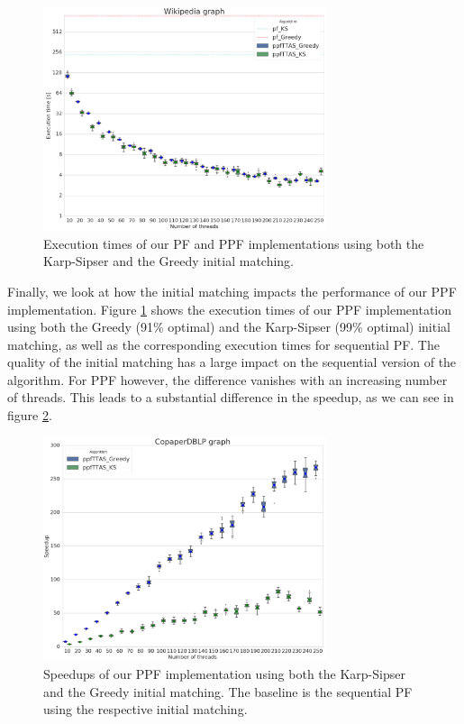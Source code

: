 \documentclass[letterpaper]{article}
\begin{document}
\begin{figure}\centering
	\includegraphics[width=8.3cm]{../../plot/output/report/wikipedia_PFvsPPFTTAS.png}
	\caption{Execution times of our PF and PPF implementations using both the Karp-Sipser and the Greedy initial matching.}
	\label{fig:ksvsgreedy}
\end{figure}

Finally, we look at how the initial matching impacts the performance of our PPF implementation. 
Figure \ref{fig:ksvsgreedy} shows the execution times of our PPF implementation using both the Greedy (91\% optimal) and the Karp-Sipser (99\% optimal) initial matching,
as well as the corresponding execution times for sequential PF. 
The quality of the initial matching has a large impact on the sequential version of the algorithm. 
For PPF however, the difference vanishes with an increasing number of threads. 
This leads to a substantial difference in the speedup, as we can see in figure \ref{fig:ksvsgreedy_s}. 

\begin{figure}
	\includegraphics[width=8.3cm]{../../plot/output/report/wikipedia_GREEDYvsKS.png}
	\caption{Speedups of our PPF implementation using both the Karp-Sipser and the Greedy initial matching. The baseline is the sequential PF using the respective initial matching.}
	\label{fig:ksvsgreedy_s}
\end{figure}
\end{document}
